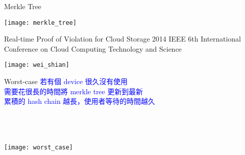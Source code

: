 \begin{frame}{Merkle Tree}
	\begin{center}
		\texttt{[image: merkle\_tree]}
	\end{center}
\end{frame}

\begin{frame}{Real-time Proof of Violation for Cloud Storage}
{2014 IEEE 6th International Conference on Cloud Computing Technology and Science}
	\begin{center}
		\texttt{[image: wei\_shian]}
	\end{center}
\end{frame}

\begin{frame}{Worst-case}
	\textcolor{blue}{若有個 device 很久沒有使用\\
    需要花很長的時間將 merkle tree 更新到最新\\
	累積的 hash chain 越長，使用者等待的時間越久}\\
	~\\
	~\\
	~\\
	\begin{center}
		\texttt{[image: worst\_case]}
	\end{center}
\end{frame}